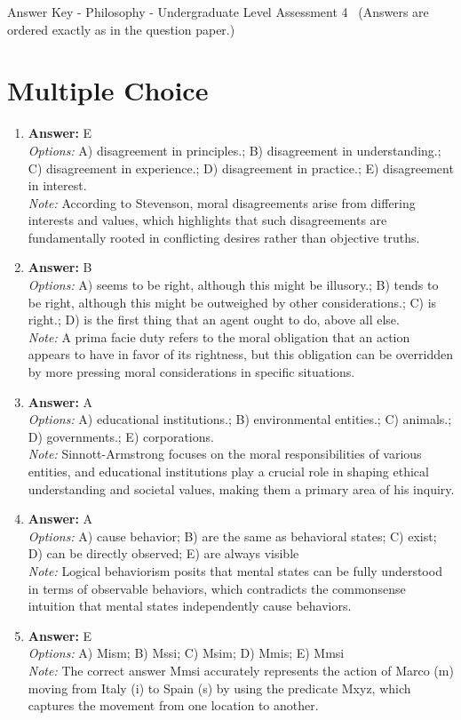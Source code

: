 \documentclass[12pt]{article}
\begin{document}
\begin{center}
Answer Key - Philosophy - Undergraduate Level Assessment 4 \
\small (Answers are ordered exactly as in the question paper.)
\end{center}

\section*{Multiple Choice}
\begin{enumerate}[label=\arabic*.]
\item \textbf{Answer:} E
\\ \textit{Options:} A) disagreement in principles.; B) disagreement in understanding.; C) disagreement in experience.; D) disagreement in practice.; E) disagreement in interest.
\\ \textit{Note:} According to Stevenson, moral disagreements arise from differing interests and values, which highlights that such disagreements are fundamentally rooted in conflicting desires rather than objective truths.
\item \textbf{Answer:} B
\\ \textit{Options:} A) seems to be right, although this might be illusory.; B) tends to be right, although this might be outweighed by other considerations.; C) is right.; D) is the first thing that an agent ought to do, above all else.
\\ \textit{Note:} A prima facie duty refers to the moral obligation that an action appears to have in favor of its rightness, but this obligation can be overridden by more pressing moral considerations in specific situations.
\item \textbf{Answer:} A
\\ \textit{Options:} A) educational institutions.; B) environmental entities.; C) animals.; D) governments.; E) corporations.
\\ \textit{Note:} Sinnott-Armstrong focuses on the moral responsibilities of various entities, and educational institutions play a crucial role in shaping ethical understanding and societal values, making them a primary area of his inquiry.
\item \textbf{Answer:} A
\\ \textit{Options:} A) cause behavior; B) are the same as behavioral states; C) exist; D) can be directly observed; E) are always visible
\\ \textit{Note:} Logical behaviorism posits that mental states can be fully understood in terms of observable behaviors, which contradicts the commonsense intuition that mental states independently cause behaviors.
\item \textbf{Answer:} E
\\ \textit{Options:} A) Mism; B) Mssi; C) Msim; D) Mmis; E) Mmsi
\\ \textit{Note:} The correct answer Mmsi accurately represents the action of Marco (m) moving from Italy (i) to Spain (s) by using the predicate Mxyz, which captures the movement from one location to another.
\end{enumerate}
\end{document}
